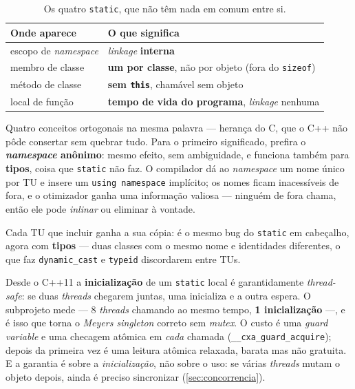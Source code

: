 \begin{table}[htbp]
\centering
\caption{Os quatro \texttt{static}, que não têm nada em comum entre si.}
\label{tab:quatro-static}
\footnotesize
\begin{tabular}{@{}ll@{}}
\toprule
\textbf{Onde aparece} & \textbf{O que significa} \\
\midrule
escopo de \emph{namespace} & \emph{linkage} \textbf{interna} \\
membro de classe           & \textbf{um por classe}, não por objeto (fora do
                             \texttt{sizeof}) \\
método de classe           & \textbf{sem \texttt{this}}, chamável sem objeto \\
local de função            & \textbf{tempo de vida do programa}, \emph{linkage}
                             nenhuma \\
\bottomrule
\end{tabular}
\end{table}

Quatro conceitos ortogonais na mesma palavra --- herança do C, que o C++ não
pôde consertar sem quebrar tudo. Para o primeiro significado, prefira o
\textbf{\emph{namespace} anônimo}: mesmo efeito, sem ambiguidade, e funciona
também para \textbf{tipos}, coisa que \texttt{static} não faz. O compilador dá
ao \emph{namespace} um nome único por TU e insere um \texttt{using namespace}
implícito; os nomes ficam inacessíveis de fora, e o otimizador ganha uma
informação valiosa --- ninguém de fora chama, então ele pode \emph{inlinar} ou
eliminar à vontade.

\begin{armadilha}
Cada TU que incluir ganha a sua cópia: é o mesmo bug do \texttt{static} em
cabeçalho, agora com \textbf{tipos} --- duas classes com o mesmo nome e
identidades diferentes, o que faz \texttt{dynamic\_cast} e \texttt{typeid}
discordarem entre TUs.
\end{armadilha}

\begin{armadilha}
Desde o C++11 a \textbf{inicialização} de um \texttt{static} local é
garantidamente \emph{thread-safe}: se duas \emph{threads} chegarem juntas, uma
inicializa e a outra espera. O subprojeto mede --- 8 \emph{threads} chamando ao
mesmo tempo, \textbf{1 inicialização} ---, e é isso que torna o \emph{Meyers
singleton} correto sem \emph{mutex}. O custo é uma \emph{guard variable} e uma
checagem atômica em \emph{cada} chamada (\texttt{\_\_cxa\_guard\_acquire});
depois da primeira vez é uma leitura atômica relaxada, barata mas não gratuita.
E a garantia é sobre a \emph{inicialização}, não sobre o uso: se várias
\emph{threads} mutam o objeto depois, ainda é preciso sincronizar
(\cref{sec:concorrencia}).
\end{armadilha}


